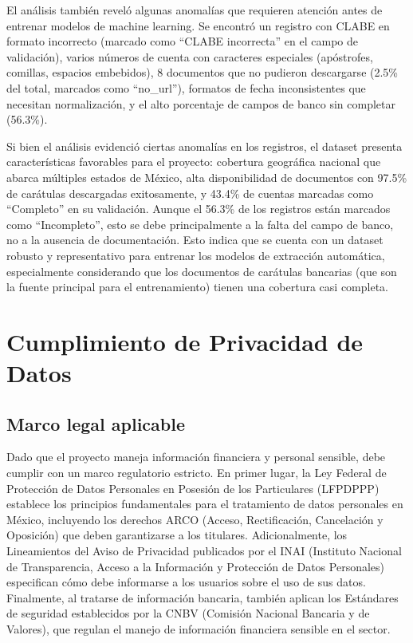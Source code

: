 El análisis también reveló algunas anomalías que requieren atención antes de entrenar modelos de machine learning. Se encontró un registro con CLABE en formato incorrecto (marcado como ``CLABE incorrecta'' en el campo de validación), varios números de cuenta con caracteres especiales (apóstrofes, comillas, espacios embebidos), 8 documentos que no pudieron descargarse (2.5\% del total, marcados como ``no\_url''), formatos de fecha inconsistentes que necesitan normalización, y el alto porcentaje de campos de banco sin completar (56.3\%). 

Si bien el análisis evidenció ciertas anomalías en los registros, el dataset presenta características favorables para el proyecto: cobertura geográfica nacional que abarca múltiples estados de México, alta disponibilidad de documentos con 97.5\% de carátulas descargadas exitosamente, y 43.4\% de cuentas marcadas como ``Completo'' en su validación. Aunque el 56.3\% de los registros están marcados como ``Incompleto'', esto se debe principalmente a la falta del campo de banco, no a la ausencia de documentación. Esto indica que se cuenta con un dataset robusto y representativo para entrenar los modelos de extracción automática, especialmente considerando que los documentos de carátulas bancarias (que son la fuente principal para el entrenamiento) tienen una cobertura casi completa.

\section{Cumplimiento de Privacidad de Datos}

\subsection{Marco legal aplicable}

Dado que el proyecto maneja información financiera y personal sensible, debe cumplir con un marco regulatorio estricto. En primer lugar, la Ley Federal de Protección de Datos Personales en Posesión de los Particulares (LFPDPPP) establece los principios fundamentales para el tratamiento de datos personales en México, incluyendo los derechos ARCO (Acceso, Rectificación, Cancelación y Oposición) que deben garantizarse a los titulares. Adicionalmente, los Lineamientos del Aviso de Privacidad publicados por el INAI (Instituto Nacional de Transparencia, Acceso a la Información y Protección de Datos Personales) especifican cómo debe informarse a los usuarios sobre el uso de sus datos. Finalmente, al tratarse de información bancaria, también aplican los Estándares de seguridad establecidos por la CNBV (Comisión Nacional Bancaria y de Valores), que regulan el manejo de información financiera sensible en el sector.

